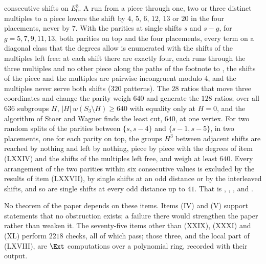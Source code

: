 \begin{enumerate}[label=\textup{(\Roman*)},leftmargin=*]
{  consecutive shifts on $E_0^8$.} A run from a piece through one, two or
  three distinct multiples to a piece lowers the shift by $4$, $5$, $6$,
  $12$, $13$ or $20$ in the four placements, never by $7$. With the parities
  at single shifts $s$ and $s-g$, for $g=5,7,9,11,13$, both parities on top
  and the four placements, every term on a diagonal class that the degrees
  allow is enumerated with the shifts of the multiples left free: at each
  shift there are exactly four, each runs through the three multiples and no
  other piece along the paths of the footnote to , the
  shifts of the piece and the multiples are pairwise incongruent modulo $4$,
  and the multiples never serve both shifts ($320$ patterns). The $28$ ratios
  that move three coordinates and change the parity weigh $640$ and generate
  the $128$ ratios; over all $636$ subgroups $H$,
  $|H|\,w(S_{3}\setminus H)\ge640$ with equality only at $H=0$, and the
  algorithm of Stoer and Wagner finds the least cut, $640$, at one vertex.
  For two random splits of the parities between $\{s,s-4\}$ and
  $\{s-1,s-5\}$, in two placements, one for each parity on top, the groups
  $H^{3}$ between adjacent shifts are reached by nothing and left by
  nothing, piece by piece with the degrees of item (LXXIV) and the shifts of
  the multiples left free, and weigh at least $640$. Every arrangement of
  the two parities within six consecutive values is excluded by the results
  of item (LXXVII), by single shifts at an odd distance or by the
  interleaved shifts, and so are single shifts at every odd distance up to
  $41$. That is , ,
  ,  and
  .
\end{enumerate}

No theorem of the paper depends on these items. Items (IV) and (V) support
statements that no obstruction exists; a failure there would strengthen the
paper rather than weaken it.
The seventy-five items other than (XXIX), (XXXI) and (XL) perform $2218$
checks, all of which pass; those three, and the local part of (LXVIII), are
$\Ext$ computations over a polynomial ring, recorded with their output.
